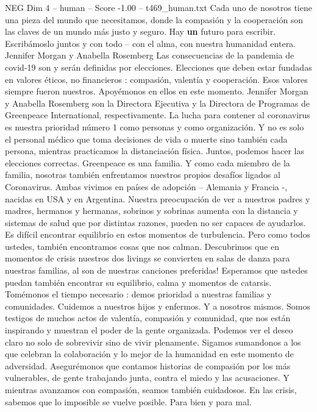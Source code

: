 \begin{textsample}{NEG Dim 4 – human – Score -1.00 – t469\_human.txt}
Cada uno de nosotros tiene una pieza del mundo que necesitamos, donde la compasión y la cooperación son las claves de un mundo más justo y seguro.
Hay \textbf{un} futuro para escribir.
Escribámoslo juntos y con todo – con el alma, con nuestra humanidad entera.
Jennifer Morgan y Anabella Rosemberg Las consecuencias de la pandemia de covid-19 son y serán definidas por elecciones.
Elecciones que deben estar fundadas en valores éticos, no financieros : compasión, valentía y cooperación.
Esos valores siempre fueron nuestros.
Apoyémonos en ellos en este momento.
Jennifer Morgan y Anabella Rosemberg son la Directora Ejecutiva y la Directora de Programas de Greenpeace International, respectivamente.
La lucha para contener al coronavirus es nuestra prioridad número 1 como personas y como organización.
Y no es solo el personal médico que toma decisiones de vida o muerte sino también cada persona, mientras practicamos la distanciación física.
Juntos, podemos hacer las elecciones correctas.
Greenpeace es una familia.
Y como cada miembro de la familia, nosotras también enfrentamos nuestros propios desafíos ligados al Coronavirus.
Ambas vivimos en países de adopción – Alemania y Francia -, nacidas en USA y en Argentina.
Nuestra preocupación de ver a nuestros padres y madres, hermanos y hermanas, sobrinos y sobrinas aumenta con la distancia y sistemas de salud que por distintas razones, pueden no ser capaces de ayudarlos.
Es difícil encontrar equilibrio en estos momentos de turbulencia.
Pero como todos ustedes, también encontramos cosas que nos calman.
Descubrimos que en momentos de crisis nuestros dos livings se convierten en salas de danza para nuestras familias, al son de nuestras canciones preferidas!
Esperamos que ustedes puedan también encontrar su equilibrio, calma y momentos de catarsis.
Tomémonos el tiempo necesario : demos prioridad a nuestras familias y comunidades.
Cuidemos a nuestros hijos y enfermos.
Y a nosotros mismos.
Somos testigos de muchos actos de valentía, compasión y comunidad, que nos están inspirando y muestran el poder de la gente organizada.
Podemos ver el deseo claro no solo de sobrevivir sino de vivir plenamente.
Sigamos sumandonos a los que celebran la colaboración y lo mejor de la humanidad en este momento de adversidad.
Asegurémonos que contamos historias de compasión por los más vulnerables, de gente trabajando junta, contra el miedo y las acusaciones.
Y mientras avanzamos con compasión, seamos también cuidadosos.
En las crisis, sabemos que lo imposible se vuelve posible.
Para bien y para mal.

\end{textsample}
